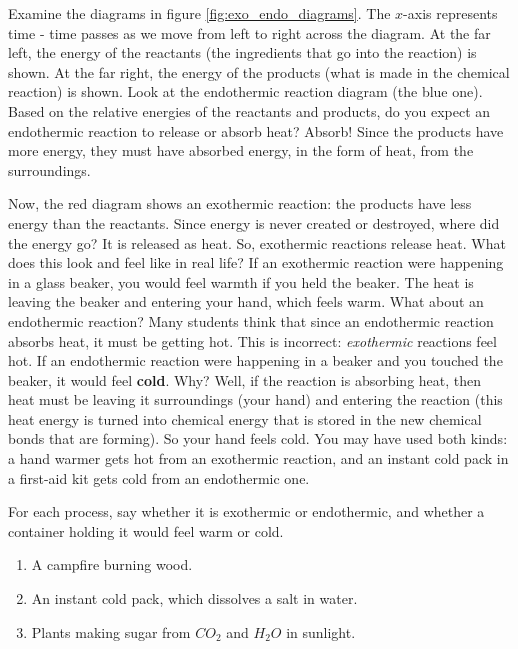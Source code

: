 Examine the diagrams in figure \ref{fig:exo_endo_diagrams}. The $x$-axis 
represents time - time passes as we move from left to right across the diagram. 
At the far left, the energy of the reactants (the ingredients that go into the 
reaction) is shown. At the far right, the energy of the products (what is made in 
the chemical reaction) is shown. Look at the endothermic reaction diagram (the blue one). Based on the
relative energies of the reactants and products, do you expect an endothermic
reaction to release or absorb heat? Absorb! Since the products have more
energy, they must have absorbed energy, in the form of heat, from the surroundings.

Now, the red diagram shows an exothermic reaction: 
the products have less energy than the reactants. Since energy is never created or destroyed, where did 
the energy go? It is released as heat. So, exothermic reactions release heat.
What does this look and feel like in real life? If an exothermic reaction were
happening in a glass beaker, you would feel warmth if you held the beaker. The
heat is leaving the beaker and entering your hand, which feels warm. What
about an endothermic reaction? Many students think that since an endothermic
reaction absorbs heat, it must be getting hot. This is incorrect:
\textit{exothermic} reactions feel hot. If an endothermic reaction were
happening in a beaker and you touched the beaker, it would feel \textbf{cold}.
Why? Well, if the reaction is absorbing heat, then heat must be leaving it
surroundings (your hand) and entering the reaction (this heat energy is turned
into chemical energy that is stored in the new chemical bonds that are
forming). So your hand feels cold. You may have used both kinds: a hand warmer gets hot from an exothermic reaction, and an instant cold pack in a first-aid kit gets cold from an endothermic one.

\begin{Exercise}[title = {Hot or Cold?}, label = exo_endo]
For each process, say whether it is exothermic or endothermic, and whether a container holding it would feel warm or cold.
\begin{enumerate}
\item A campfire burning wood.
\item An instant cold pack, which dissolves a salt in water.
\item Plants making sugar from $CO_2$ and $H_2O$ in sunlight.
\end{enumerate}
\end{Exercise}

